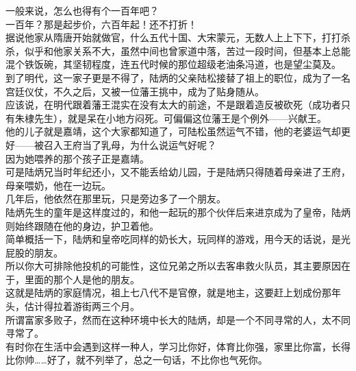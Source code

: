 \begin{multicols}{\theparacolNo}
一般来说，怎么也得有个一百年吧？\\

一百年？那是起步价，六百年起！还不打折！\\

据说他家从隋唐开始就做官，什么五代十国、大宋蒙元，无数人上上下下，打打杀杀，似乎和他家关系不大，虽然中间也曾家道中落，苦过一段时间，但基本上总能混个铁饭碗，其坚韧程度，连五代时候的那位超级老油条冯道，也是望尘莫及。\\

到了明代，这一家子更是不得了，陆炳的父亲陆松接替了祖上的职位，成为了一名宫廷仪仗，不久之后，又被一位藩王挑中，成为了贴身随从。\\

应该说，在明代跟着藩王混实在没有太大的前途，不是跟着造反被砍死（成功者只有朱棣先生），就是呆在小地方闷死。可偏偏这位藩王是个例外——兴献王。\\

他的儿子就是嘉靖，这个大家都知道了，可陆松虽然运气不错，他的老婆运气却更好——被召入王府当了乳母，为什么说运气好呢？\\

因为她喂养的那个孩子正是嘉靖。\\

可是陆炳兄当时年纪还小，又不能丢给幼儿园，于是陆炳只得随着母亲进了王府，母亲喂奶，他在一边玩。\\

几年后，他依然在那里玩，只是旁边多了一个朋友。\\

陆炳先生的童年是这样度过的，和他一起玩的那个伙伴后来进京成为了皇帝，陆炳则始终跟随在他的身边，护卫着他。\\

简单概括一下，陆炳和皇帝吃同样的奶长大，玩同样的游戏，用今天的话说，是光屁股的朋友。\\

所以你大可排除他投机的可能性，这位兄弟之所以去客串救火队员，其主要原因在于，里面的那个人是他的朋友。\\

这就是陆炳的家庭情况，祖上七八代不是官僚，就是地主，这要赶上划成份那年头，估计得拉着游街两三个月。\\

所谓富家多败子，然而在这种环境中长大的陆炳，却是一个不同寻常的人，太不同寻常了。\\

有时你在生活中会遇到这样一种人，学习比你好，体育比你强，家里比你富，长得比你帅……好了，就不列举了，总之一句话，不比你也气死你。\\


\end{multicols}
